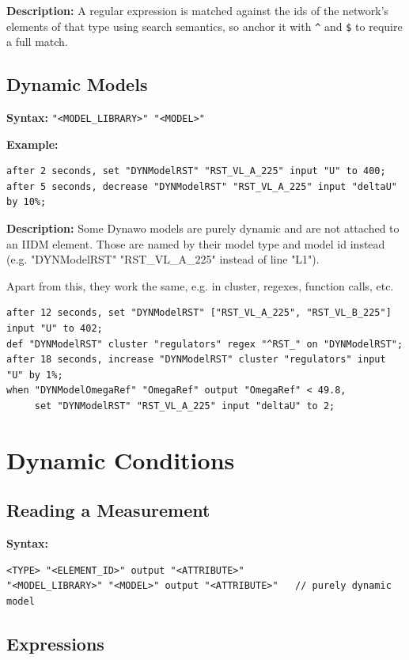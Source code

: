 \documentclass[12pt]{article}
\begin{document}
\textbf{Description:} A regular expression is matched against the ids of the network's elements of that type using search semantics, so anchor it with \texttt{\^{}} and \texttt{\$} to require a full match.

\subsection{Dynamic Models}

\textbf{Syntax:} \texttt{"<MODEL\_LIBRARY>" "<MODEL>"}

\textbf{Example:}
\begin{lstlisting}
after 2 seconds, set "DYNModelRST" "RST_VL_A_225" input "U" to 400;
after 5 seconds, decrease "DYNModelRST" "RST_VL_A_225" input "deltaU" by 10%;
\end{lstlisting}

\textbf{Description:} Some Dynawo models are purely dynamic and are not attached to an IIDM element. Those are named by their model type and model id instead (e.g. "DYNModelRST" "RST\_VL\_A\_225" instead of line "L1").

Apart from this, they work the same, e.g. in cluster, regexes, function calls, etc.

\begin{lstlisting}
after 12 seconds, set "DYNModelRST" ["RST_VL_A_225", "RST_VL_B_225"] input "U" to 402;
def "DYNModelRST" cluster "regulators" regex "^RST_" on "DYNModelRST";
after 18 seconds, increase "DYNModelRST" cluster "regulators" input "U" by 1%;
when "DYNModelOmegaRef" "OmegaRef" output "OmegaRef" < 49.8,
     set "DYNModelRST" "RST_VL_A_225" input "deltaU" to 2;
\end{lstlisting}

\section{Dynamic Conditions}
\label{sec:conditions}

\subsection{Reading a Measurement}

\textbf{Syntax:}
\begin{lstlisting}
<TYPE> "<ELEMENT_ID>" output "<ATTRIBUTE>"
"<MODEL_LIBRARY>" "<MODEL>" output "<ATTRIBUTE>"   // purely dynamic model
\end{lstlisting}

\subsection{Expressions}
\end{document}
